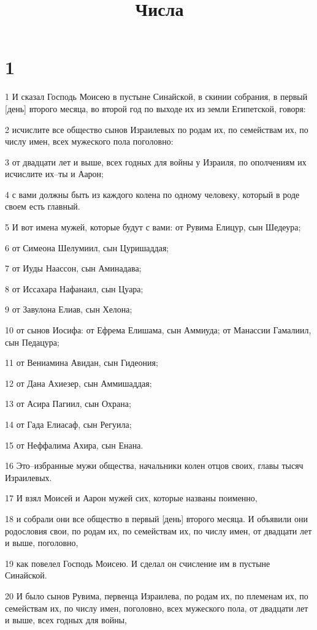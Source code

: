 

\title{Числа}


\chapter{1}

\par 1 И сказал Господь Моисею в пустыне Синайской, в скинии собрания, в первый [день] второго месяца, во второй год по выходе их из земли Египетской, говоря:
\par 2 исчислите все общество сынов Израилевых по родам их, по семействам их, по числу имен, всех мужеского пола поголовно:
\par 3 от двадцати лет и выше, всех годных для войны у Израиля, по ополчениям их исчислите их--ты и Аарон;
\par 4 с вами должны быть из каждого колена по одному человеку, который в роде своем есть главный.
\par 5 И вот имена мужей, которые будут с вами: от Рувима Елицур, сын Шедеура;
\par 6 от Симеона Шелумиил, сын Цуришаддая;
\par 7 от Иуды Наассон, сын Аминадава;
\par 8 от Иссахара Нафанаил, сын Цуара;
\par 9 от Завулона Елиав, сын Хелона;
\par 10 от сынов Иосифа: от Ефрема Елишама, сын Аммиуда; от Манассии Гамалиил, сын Педацура;
\par 11 от Вениамина Авидан, сын Гидеония;
\par 12 от Дана Ахиезер, сын Аммишаддая;
\par 13 от Асира Пагиил, сын Охрана;
\par 14 от Гада Елиасаф, сын Регуила;
\par 15 от Неффалима Ахира, сын Енана.
\par 16 Это--избранные мужи общества, начальники колен отцов своих, главы тысяч Израилевых.
\par 17 И взял Моисей и Аарон мужей сих, которые названы поименно,
\par 18 и собрали они все общество в первый [день] второго месяца. И объявили они родословия свои, по родам их, по семействам их, по числу имен, от двадцати лет и выше, поголовно,
\par 19 как повелел Господь Моисею. И сделал он счисление им в пустыне Синайской.
\par 20 И было сынов Рувима, первенца Израилева, по родам их, по племенам их, по семействам их, по числу имен, поголовно, всех мужеского пола, от двадцати лет и выше, всех годных для войны,

